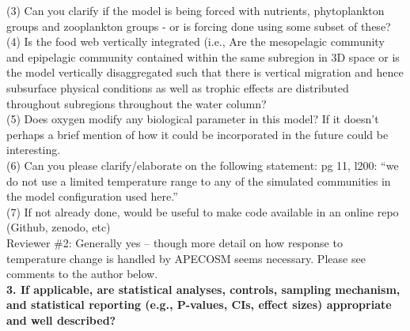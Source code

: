 \documentclass{article}
\begin{document}

(3) Can you clarify if the model is being forced with nutrients, phytoplankton groups and zooplankton groups - or is forcing done using some subset of these? \\


(4) Is the food web vertically integrated (i.e., Are the mesopelagic community and epipelagic community contained within the same subregion in 3D space or is the model vertically disaggregated such that there is vertical migration and hence subsurface physical conditions as well as trophic effects are distributed throughout subregions throughout the water column? \\ 


(5) Does oxygen modify any biological parameter in this model? If it doesn’t perhaps a brief mention of how it could be incorporated in the future could be interesting. \\ 


(6) Can you please clarify/elaborate on the following statement: pg 11, l200: “we do not use a limited temperature range to any of the simulated communities in the model configuration used here.” \\


(7) If not already done, would be useful to make code available in an online repo (Github, zenodo, etc) \\ 


Reviewer \#2: Generally yes -- though more detail on how response to temperature change is handled by APECOSM seems necessary. Please see comments to the author below. \\

\textbf{3. If applicable, are statistical analyses, controls, sampling mechanism, and statistical reporting (e.g., P-values, CIs, effect sizes) appropriate and well described?} \\
\end{document}
